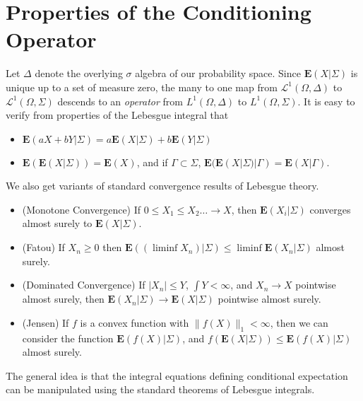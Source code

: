 \section{Properties of the Conditioning Operator}

Let $\Delta$ denote the overlying $\sigma$ algebra of our probability space. Since $\mathbf{E}(X|\Sigma)$ is unique up to a set of measure zero, the many to one map from $\mathcal{L}^1(\Omega, \Delta)$ to $\mathcal{L}^1(\Omega, \Sigma)$ descends to an {\it operator} from $L^1(\Omega, \Delta)$ to $L^1(\Omega, \Sigma)$. It is easy to verify from properties of the Lebesgue integral that
%
\begin{itemize}
    \item $\mathbf{E}(aX + bY|\Sigma) = a \mathbf{E}(X|\Sigma) + b \mathbf{E}(Y|\Sigma)$
    \item $\mathbf{E}(\mathbf{E}(X|\Sigma)) = \mathbf{E}(X)$, and if $\Gamma \subset \Sigma$, $\mathbf{E}(\mathbf{E}(X|\Sigma)|\Gamma) = \mathbf{E}(X|\Gamma)$.
\end{itemize}
%
We also get variants of standard convergence results of Lebesgue theory.
%
\begin{itemize}
    \item (Monotone Convergence) If $0 \leq X_1 \leq X_2 \dots \to X$, then $\mathbf{E}(X_i|\Sigma)$ converges almost surely to $\mathbf{E}(X|\Sigma)$.
    \item (Fatou) If $X_n \geq 0$ then $\mathbf{E}((\liminf X_n)|\Sigma) \leq \liminf \mathbf{E}(X_n|\Sigma)$ almost surely.
    \item (Dominated Convergence) If $|X_n| \leq Y$, $\int Y < \infty$, and $X_n \to X$ pointwise almost surely, then $\mathbf{E}(X_n|\Sigma) \to \mathbf{E}(X|\Sigma)$ pointwise almost surely.
    \item (Jensen) If $f$ is a convex function with $\| f(X) \|_1 < \infty$, then we can consider the function $\mathbf{E}(f(X)|\Sigma)$, and $f(\mathbf{E}(X|\Sigma)) \leq \mathbf{E}(f(X)|\Sigma)$ almost surely.
\end{itemize}
%
The general idea is that the integral equations defining conditional expectation can be manipulated using the standard theorems of Lebesgue integrals.

